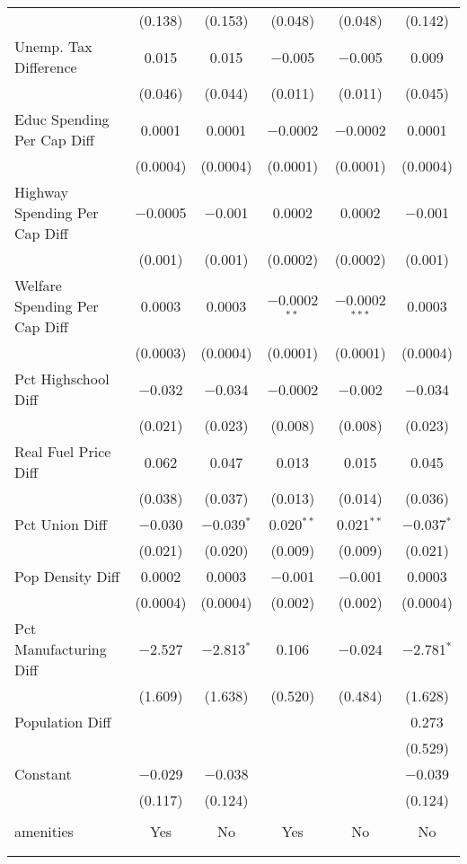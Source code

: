 \begin{table}[!htbp]
\begin{tabular}{@{\extracolsep{5pt}}lccccc}
  & (0.138) & (0.153) & (0.048) & (0.048) & (0.142) \\ 
  Unemp. Tax Difference & 0.015 & 0.015 & $-$0.005 & $-$0.005 & 0.009 \\ 
  & (0.046) & (0.044) & (0.011) & (0.011) & (0.045) \\ 
  Educ Spending Per Cap Diff & 0.0001 & 0.0001 & $-$0.0002 & $-$0.0002 & 0.0001 \\ 
  & (0.0004) & (0.0004) & (0.0001) & (0.0001) & (0.0004) \\ 
  Highway Spending Per Cap Diff & $-$0.0005 & $-$0.001 & 0.0002 & 0.0002 & $-$0.001 \\ 
  & (0.001) & (0.001) & (0.0002) & (0.0002) & (0.001) \\ 
  Welfare Spending Per Cap Diff & 0.0003 & 0.0003 & $-$0.0002$^{**}$ & $-$0.0002$^{***}$ & 0.0003 \\ 
  & (0.0003) & (0.0004) & (0.0001) & (0.0001) & (0.0004) \\ 
  Pct Highschool Diff & $-$0.032 & $-$0.034 & $-$0.0002 & $-$0.002 & $-$0.034 \\ 
  & (0.021) & (0.023) & (0.008) & (0.008) & (0.023) \\ 
  Real Fuel Price Diff & 0.062 & 0.047 & 0.013 & 0.015 & 0.045 \\ 
  & (0.038) & (0.037) & (0.013) & (0.014) & (0.036) \\ 
  Pct Union Diff & $-$0.030 & $-$0.039$^{*}$ & 0.020$^{**}$ & 0.021$^{**}$ & $-$0.037$^{*}$ \\ 
  & (0.021) & (0.020) & (0.009) & (0.009) & (0.021) \\ 
  Pop Density Diff & 0.0002 & 0.0003 & $-$0.001 & $-$0.001 & 0.0003 \\ 
  & (0.0004) & (0.0004) & (0.002) & (0.002) & (0.0004) \\ 
  Pct Manufacturing Diff & $-$2.527 & $-$2.813$^{*}$ & 0.106 & $-$0.024 & $-$2.781$^{*}$ \\ 
  & (1.609) & (1.638) & (0.520) & (0.484) & (1.628) \\ 
  Population Diff &  &  &  &  & 0.273 \\ 
  &  &  &  &  & (0.529) \\ 
  Constant & $-$0.029 & $-$0.038 &  &  & $-$0.039 \\ 
  & (0.117) & (0.124) &  &  & (0.124) \\ 
 \hline \\[-1.8ex] 
amenities & Yes & No & Yes & No & No \\ 
\hline \\[-1.8ex] 
\hline 
\hline \\[-1.8ex] 
\end{tabular} 
\end{table} 

